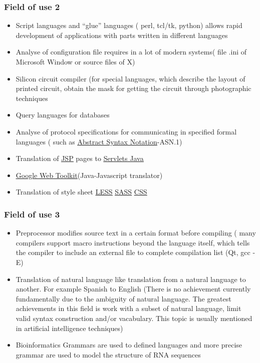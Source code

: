 \documentclass{beamer}
\begin{document}
\begin{frame}
\frametitle{Field of use 2}
\begin{itemize}
\item Script languages and ``glue'' languages ( perl, tcl/tk, python) allows rapid development of applications with parts written in different languages
\item Analyse of configuration file requires in a lot of modern systems( file .ini of Microsoft Window or source files of X)
\item Silicon circuit compiler (for special languages, which describe the layout of printed circuit, obtain the mask for getting the circuit through photographic techniques
\item Query languages for databases
\item Analyse of protocol specifications for communicating in specified formal languages ( such as \href{https://en.wikipedia.org/wiki/Abstract_Syntax_Notation_One}{\underline{Abstract Syntax Notation}}-ASN.1)
\item Translation of \href{https://en.wikipedia.org/wiki/JavaServer_Pages}{\underline{JSP}} pages to \href{https://en.wikipedia.org/wiki/Java_serlets}{\underline{Servlets Java}} 
\item \href{}{\underline{Google Web Toolkit}}(Java-Javascript translator)
\item Translation of style sheet \href{https://es.wikipedia.org/wiki/LESS_(lenguaje_de_hojas_de_estilo)}{\underline{LESS}} \href{https://es.wikipedia.org/wiki/Sass_(lenguaje_de_hojas_de_estilo)}{\underline{SASS}}
\href{https://en.wikipedia.org/wiki/Cascading_Style_Sheets}{\underline{CSS}}
\end{itemize}
\end{frame}


\begin{frame}
\frametitle{Field of use 3}
\begin{itemize}
\item Preprocessor modifies source text in a certain format before compiling ( many compilers support macro instructions beyond the language itself, which tells the compiler to include an external file to complete compilation list (Qt, gcc -E)
\item Translation of natural language like translation from a natural language to another. For example Spanish to English (There is no achievement currently fundamentally due to the ambiguity of natural language. The greatest achievements in this field is work with a subset of natural language, limit valid syntax construction and/or vacabulary. This topic is usually mentioned in artificial intelligence techniques)
\item Bioinformatics Grammars are used to defined languages and more precise grammar are used to model the structure of RNA sequences
\end{itemize}
\end{frame}
\end{document}
